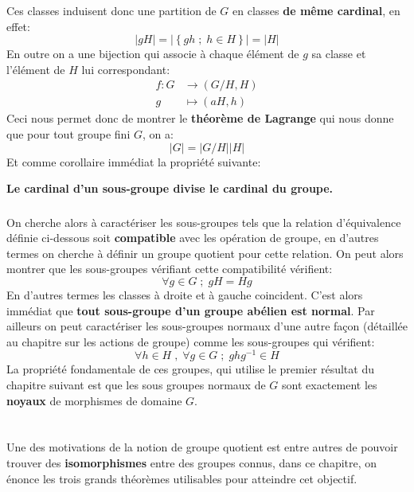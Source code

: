 \subsection*{}
Ces classes induisent donc une partition de \( G \) en classes \textbf{de même cardinal}, en effet:
\[ 
   |gH| = \left|\left\{ gh \; ; \; h \in H \right\} \right| = |H|
\]
En outre on a une bijection qui associe à chaque élément de \( g \) sa classe et l'élément de \( H \) lui correspondant:
\[ 
   \begin{aligned}
      f : G &\longrightarrow (G/H, H)\\
      g &\longmapsto (aH, h)
   \end{aligned}
\]
Ceci nous permet donc de montrer le \textbf{théorème de Lagrange} qui nous donne que pour tout groupe fini \( G \), on a:
\[ 
   |G| = |G/H||H|
\]
Et comme corollaire immédiat la propriété suivante:
\begin{center}
   \textbf{Le cardinal d'un sous-groupe divise le cardinal du groupe.}
\end{center}
\subsection*{}
On cherche alors à caractériser les sous-groupes tels que la relation d'équivalence définie ci-dessous soit \textbf{compatible} avec les opération de groupe, en d'autres termes on cherche à définir un groupe quotient pour cette relation. On peut alors montrer que les sous-groupes vérifiant cette compatibilité vérifient:
\[ 
   \forall g \in G \; ; \; gH = Hg 
\]
En d'autres termes les classes à droite et à gauche coincident. C'est alors immédiat que \textbf{tout sous-groupe d'un groupe abélien est normal}. Par ailleurs on peut caractériser les sous-groupes normaux d'une autre façon (détaillée au chapitre sur les actions de groupe) comme les sous-groupes qui vérifient:
\[ 
   \forall h \in H \; , \; \forall g \in G \; ; \; ghg^{-1} \in H 
\]
La propriété fondamentale de ces groupes, qui utilise le premier résultat du chapitre suivant est que les sous groupes normaux de \( G \) sont exactement les \textbf{noyaux} de morphismes de domaine \( G \).
\chapter*{}
Une des motivations de la notion de groupe quotient est entre autres de pouvoir trouver des \textbf{isomorphismes} entre des groupes connus, dans ce chapitre, on énonce les trois grands théorèmes utilisables pour atteindre cet objectif.

